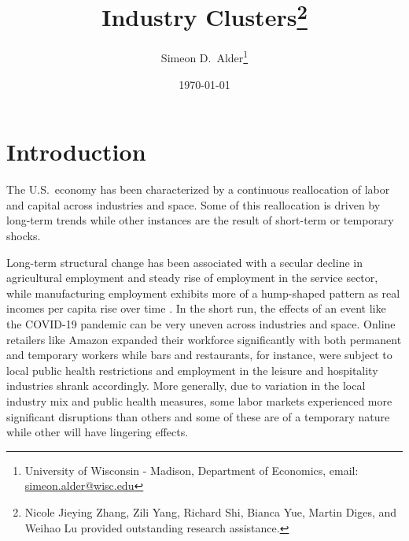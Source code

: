 \documentclass[onehalfspacing,11pt]{article}
\begin{document}
\begin{titlepage}

\title{Industry Clusters\footnote{Nicole Jieying Zhang, Zili Yang, Richard Shi, Bianca Yue, Martin Diges, and Weihao Lu provided outstanding research assistance.}}

\author{Simeon D.~Alder\footnote{University of Wisconsin - Madison, Department of Economics, email: \url{simeon.alder@wisc.edu}}}
\date{\today} %

\maketitle
%
%
%
\end{titlepage}


\section{Introduction}
The U.S.~economy has been characterized by a continuous reallocation of labor and capital across industries and space. Some of this reallocation is driven by long-term trends while other instances are the result of short-term or temporary shocks.

Long-term structural change has been associated with a secular decline in agricultural employment and steady rise of employment in the service sector, while manufacturing employment exhibits more of a hump-shaped pattern as real incomes per capita rise over time \citep{Herrendorf:2013b}. In the short run, the effects of an event like the COVID-19 pandemic can be very uneven across industries and space. Online retailers like Amazon expanded their workforce significantly with both permanent and temporary workers while bars and restaurants, for instance, were subject to local public health restrictions and employment in the leisure and hospitality industries shrank accordingly. More generally, due to variation in the local industry mix and public health measures, some labor markets experienced more significant disruptions than others and some of these are of a temporary nature while other will have lingering effects.
\end{document}

